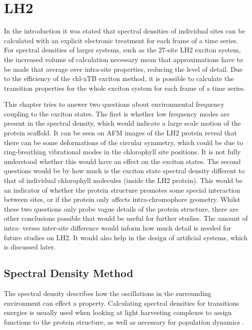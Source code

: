 \section{LH2}
\label{sec:LH2}

In the introduction it was stated that spectral densities of individual sites can
be calculated with an explicit electronic treatment for each frame of a time series.
For spectral densities of larger systems, such as the 27-site LH2 exciton system,
the increased volume of calculation necessary mean that approximations have to be
made that average over intra-site properties, reducing the level of detail. Due 
to the efficiency of the chl-xTB exciton method, it is possible to calculate the
transition properties for the whole exciton system for each frame of a time series.

This chapter tries to answer two questions about environmental frequency coupling
to the exciton states. The first is whether low frequency modes are present in the
spectral density, which would indicate a large scale motion of the protein scaffold.
It can be seen on AFM images of the LH2 protein reveal that there can be some deformations
of the circular symmetry, which could be due to ring-breathing vibrational modes 
in the chlorophyll site positions. It is not fully understood whether this would
have an effect on the exciton states. The second questions would be by how much 
is the exciton state spectral density different to that of individual chlorophyll 
molecules (inside the LH2 protein). This would be an indicator of whether the protein
structure promotes some special interaction between sites, or if the protein only
affects intra-chromophore geometry. Whilst these two questions only probe vague
details of the protein structure, there are other conclusions possible that would
be useful for further studies. The amount of intra- verses inter-site difference
would inform how much detail is needed for future studies on LH2. It would also 
help in the design of artificial systems, which is discussed later.

\subsection{Spectral Density Method}
\label{subsec:spec_dens}

The spectral density describes how the oscillations in the surrounding environment 
can effect a property. Calculating spectral densities for transitions energies is
usually used when looking at light harvesting complexes to assign functions to the 
protein structure, as well as necessary for population dynamics \cite{Mallus2018}.

